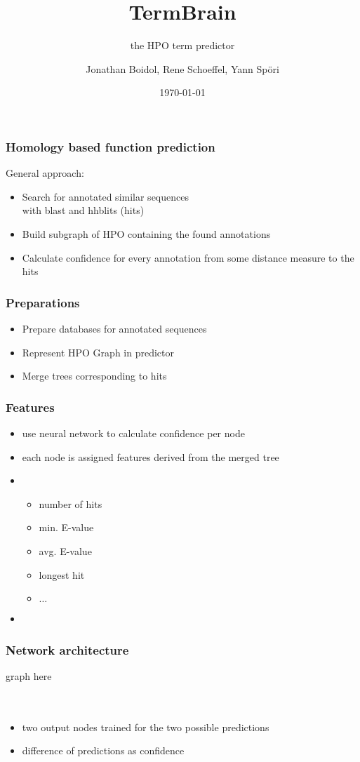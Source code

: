 \documentclass{beamer}
\author{Jonathan Boidol, Rene Schoeffel, Yann Sp\"ori}
\title{TermBrain}
\subtitle{the HPO term predictor}
\date{\today}
\begin{document}
\begin{frame}
\maketitle
 
\end{frame}

\begin{frame}
  \frametitle{Homology based function prediction}
  General approach:
  \begin{itemize}
  	\item Search for annotated similar sequences\\with blast and hhblits (hits)
  	\item Build subgraph of HPO containing the found annotations
  	\item Calculate confidence for every annotation from some distance measure to the hits
  \end{itemize}

\end{frame}

\begin{frame}
	\frametitle{Preparations}
		\begin{itemize}
			\item Prepare databases for annotated sequences
			\item Represent HPO Graph in predictor
			\item Merge trees corresponding to hits
		\end{itemize}
\end{frame}

\begin{frame}
	\frametitle{Features}
	\begin{itemize}
		\item use neural network to calculate confidence per node
		\item each node is assigned features derived from the merged tree
		\item[] \begin{itemize}
					\item number of hits
					\item min. E-value	
					\item avg. E-value \qquad[3, 0.0074, 0.45, 84, $\dots$]
					\item longest hit
					\item $\dots$ 
				\end{itemize}
				\item[] 
	\end{itemize}
\end{frame}

\begin{frame}
	\frametitle{Network architecture}
	graph here\\
	\hfill\\
	\hfill\\
	\begin{itemize}
		\item two output nodes trained for the two possible predictions
		\item difference of predictions as confidence
	\end{itemize}
	
		
	
\end{frame}
\end{document}
